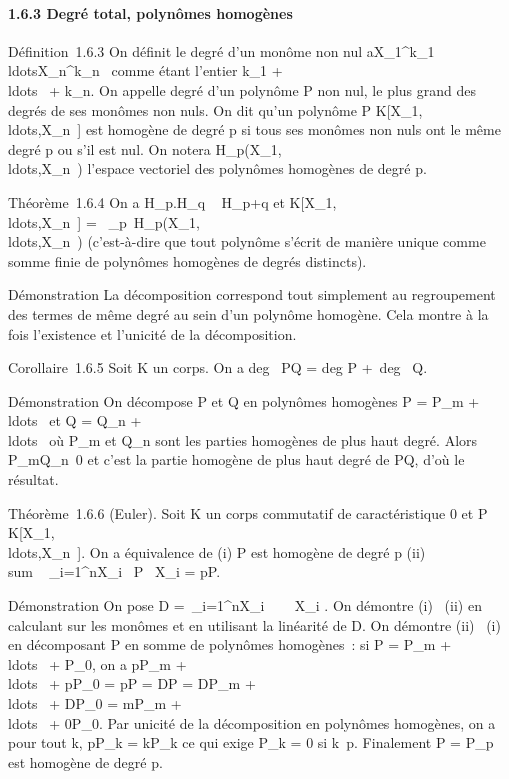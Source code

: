\documentclass[]{article}
\begin{document}
\paragraph{1.6.3 Degré total, polynômes homogènes}

Définition~1.6.3 On définit le degré d'un monôme non nul
aX\_1^k\_1\\ldotsX\_n^k\_n~
comme étant l'entier k\_1 +
\\ldots~ +
k\_n. On appelle degré d'un polynôme P non nul, le plus grand
des degrés de ses monômes non nuls. On dit qu'un polynôme P \in
K{[}X\_1,\\ldots,X\_n~{]}
est homogène de degré p si tous ses monômes non nuls ont le même degré p
ou s'il est nul. On notera
H\_p(X\_1,\\ldots,X\_n~)
l'espace vectoriel des polynômes homogènes de degré p.

Théorème~1.6.4 On a H\_p.H\_q \subset~ H\_p+q et
K{[}X\_1,\\ldots,X\_n~{]}
=
\oplus~\_p\in{}~H\_p(X\_1,\\ldots,X\_n~)
(c'est-à-dire que tout polynôme s'écrit de manière unique comme somme
finie de polynômes homogènes de degrés distincts).

Démonstration La décomposition correspond tout simplement au
regroupement des termes de même degré au sein d'un polynôme homogène.
Cela montre à la fois l'existence et l'unicité de la décomposition.

Corollaire~1.6.5 Soit K un corps. On a deg~ PQ
= deg P +\ deg~ Q.

Démonstration On décompose P et Q en polynômes homogènes P =
P\_m +
\\ldots~ et Q =
Q\_n +
\\ldots~ où
P\_m et Q\_n sont les parties homogènes de plus haut
degré. Alors P\_mQ\_n\neq~0 et
c'est la partie homogène de plus haut degré de PQ, d'où le résultat.

Théorème~1.6.6 (Euler). Soit K un corps commutatif de caractéristique 0
et P \in
K{[}X\_1,\\ldots,X\_n~{]}.
On a équivalence de (i) P est homogène de degré p (ii)
\\sum ~
\_i=1^nX\_i \partial~P \over
\partial~X\_i = pP.

Démonstration On pose D =\
\sum  \_i=1^nX\_i~ \partial~
\over \partial~X\_i . On démontre (i) \rigtharrow~(ii) en
calculant sur les monômes et en utilisant la linéarité de D. On démontre
(ii) \rigtharrow~(i) en décomposant P en somme de polynômes homogènes~: si P =
P\_m +
\\ldots~ +
P\_0, on a pP\_m +
\\ldots~ +
pP\_0 = pP = DP = DP\_m +
\\ldots~ +
DP\_0 = mP\_m +
\\ldots~ +
0P\_0. Par unicité de la décomposition en polynômes homogènes,
on a pour tout k, pP\_k = kP\_k ce qui exige
P\_k = 0 si k\neq~p. Finalement P =
P\_p est homogène de degré p.
\end{document}
